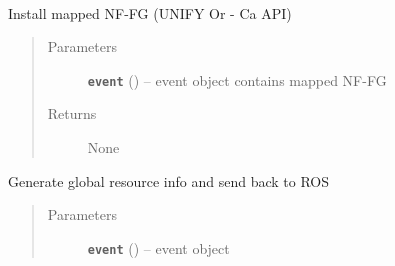 \documentclass[letterpaper,10pt,english]{sphinxmanual}
\begin{document}
\begin{fulllineitems}
\begin{fulllineitems}
\label{adapt/cas_API:escape.adapt.cas_API.ControllerAdaptationAPI.shutdown}~



{\hyperref[util/api:escape.util.api.AbstractAPI.shutdown]{\emph{}}}



\end{fulllineitems}


\begin{fulllineitems}
\label{adapt/cas_API:escape.adapt.cas_API.ControllerAdaptationAPI._handle_InstallNFFGEvent}
Install mapped NF-FG (UNIFY Or - Ca API)
\begin{quote}\begin{description}
\item[{Parameters}] \leavevmode
\textbf{\texttt{event}} ({\hyperref[orchest/ros_API:escape.orchest.ros_API.InstallNFFGEvent]{\emph{}}}) -- event object contains mapped NF-FG

\item[{Returns}] \leavevmode
None

\end{description}\end{quote}

\end{fulllineitems}


\begin{fulllineitems}
\label{adapt/cas_API:escape.adapt.cas_API.ControllerAdaptationAPI._handle_GetGlobalResInfoEvent}
Generate global resource info and send back to ROS
\begin{quote}\begin{description}
\item[{Parameters}] \leavevmode
\textbf{\texttt{event}} ({\hyperref[orchest/ros_API:escape.orchest.ros_API.GetGlobalResInfoEvent]{\emph{}}}) -- event object


\end{description}
\end{quote}
\end{fulllineitems}
\end{fulllineitems}
\end{document}
